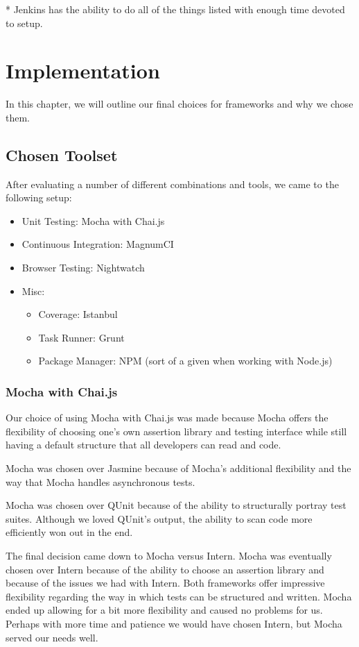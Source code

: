 \documentclass[12pt]{ucthesis}
\begin{document}
* Jenkins has the ability to do all of the things listed with enough time devoted to setup.

\normalsize
\chapter{Implementation}
In this chapter, we will outline our final choices for frameworks and why we chose them.

\section{Chosen Toolset}
After evaluating a number of different combinations and tools, we came to the following setup:
\begin{itemize}
  \item Unit Testing: Mocha with Chai.js
  \item Continuous Integration: MagnumCI
  \item Browser Testing: Nightwatch
  \item Misc:
    \begin{itemize}
      \item Coverage: Istanbul
      \item Task Runner: Grunt
      \item Package Manager: NPM (sort of a given when working with Node.js)
    \end{itemize}
\end{itemize}

\subsection{Mocha with Chai.js}
Our choice of using Mocha with Chai.js was made because Mocha offers the flexibility of choosing one's own assertion library and testing interface while still having a default structure that all developers can read and code.

Mocha was chosen over Jasmine because of Mocha's additional flexibility and the way that Mocha handles asynchronous tests.

Mocha was chosen over QUnit because of the ability to structurally portray test suites. Although we loved QUnit's output, the ability to scan code more efficiently won out in the end.

The final decision came down to Mocha versus Intern. Mocha was eventually chosen over Intern because of the ability to choose an assertion library and because of the issues we had with Intern. Both frameworks offer impressive flexibility regarding the way in which tests can be structured and written. Mocha ended up allowing for a bit more flexibility and caused no problems for us. Perhaps with more time and patience we would have chosen Intern, but Mocha served our needs well.
\end{document}
